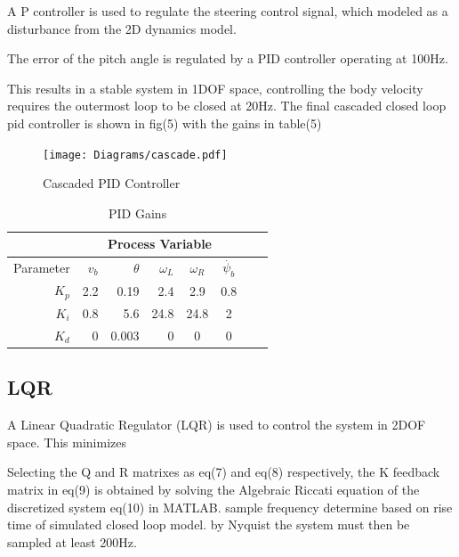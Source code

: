         A P controller is used to regulate the steering control signal, which modeled
        as a disturbance from the 2D dynamics model.

        The error of the pitch angle is regulated by a PID controller operating at 100Hz. 
        
        This results in a stable system in 1DOF space, controlling the body velocity requires the outermost loop to be closed at 20Hz.
        The final cascaded closed loop pid controller is shown in fig(5) with the gains in table(5)

        \begin{figure}[H]
            \texttt{[image: Diagrams/cascade.pdf]}
            \caption{Cascaded PID Controller}
        \end{figure}

        \begin{table}[H]
            \centering
            \begin{tabular}{|r|r|r|r|c|c|c|c}
                \hline
                & \multicolumn{5}{c|}{Process Variable}  \\
                \hline
                Parameter & $v_b$ & $\theta$  & $\omega_L$ & $\omega_R$ & $\dot{\psi_b}$ \\
                \hline      
                $K_p$ & 2.2 & 0.19 & 2.4 & 2.9 & 0.8 \\
                $K_i$ & 0.8 & 5.6 & 24.8 & 24.8 & 2\\
                $K_d$ & 0 & 0.003 & 0 & 0  &  0\\
                \hline
            \end{tabular}
            \caption{PID Gains}
        \end{table}
        \pagebreak{}
        \subsection{LQR}
        A Linear Quadratic Regulator (LQR) is used to control the system in 2DOF space.
        This minimizes 
        
       
        Selecting the Q and R matrixes as eq(7) and eq(8) respectively, 
        the K feedback matrix in eq(9) is obtained by solving the Algebraic Riccati
        equation of the discretized system eq(10) in MATLAB.
        sample frequency determine based on rise time of simulated closed loop model. 
        by Nyquist the system must then be sampled at least 200Hz. 

        \pagebreak{}
